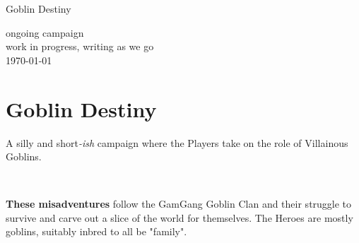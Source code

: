 







\pagestyle{empty}

\begin{center}
\huge
Goblin Destiny

\vspace{2cm}

\normalsize
ongoing campaign\\
work in progress, writing as we go\\

\today

\end{center}






\cleardoublepage
\pagestyle{fancy}

\setcounter{page}{1}




\section*{Goblin Destiny}

A silly and short\emph{-ish} campaign where the Players take on the role of Villainous Goblins.

\

\textbf{These misadventures} follow the GamGang Goblin Clan and their struggle to survive and carve out a slice of the world for themselves. The Heroes are mostly goblins, suitably inbred to all be "family".

